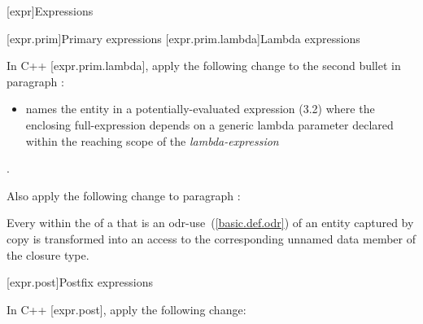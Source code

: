 [expr]{Expressions}

\setcounter{section}{0}
[expr.prim]{Primary expressions}
\setcounter{subsection}{1}
[expr.prim.lambda]{Lambda expressions}

\pnum
In C++ [expr.prim.lambda], apply the following change to the second bullet in paragraph :

\renewcommand{\labelitemi}{---}
\begin{std.txt}
\begin{itemize}
\item names the entity in a potentially-evaluated expression (3.2) where the enclosing full-expression depends on a generic lambda parameter declared within the reaching scope of the \textit{lambda-expression}\added{;} %
\end{itemize}
.
\end{std.txt}
\renewcommand{\labelitemi}{---\parabullnum{Bullets1}{\labelsep}}

\pnum
Also apply the following change to paragraph :

\begin{std.txt}
Every  within the  of a  that is an odr-use~(\ref{basic.def.odr}) of an entity captured by copy is transformed into an access to the corresponding unnamed data member of the closure type.
\end{std.txt}

[expr.post]{Postfix expressions}

\pnum
In C++ [expr.post], apply the following change:

